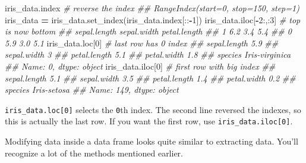 \documentclass[12pt,krantz2]{krantz}
\makeatletter
\newenvironment{Shaded}{\begin{snugshade}}{\end{snugshade}}
\newcommand{\CommentTok}[1]{\textcolor[rgb]{0.37,0.37,0.37}{\textit{#1}}}
\newcommand{\DecValTok}[1]{\textcolor[rgb]{0.06,0.06,0.06}{#1}}
\newcommand{\NormalTok}[1]{#1}
\newcommand{\OperatorTok}[1]{\textcolor[rgb]{0.43,0.43,0.43}{\textbf{#1}}}
\newenvironment{kframe}{%
\medskip{}
\setlength{\fboxsep}{.8em}
 \def\at@end@of@kframe{}%
 \ifinner\ifhmode%
  \def\at@end@of@kframe{\end{minipage}}%
  \begin{minipage}{\columnwidth}%
 \fi\fi%
 \def\FrameCommand##1{\hskip\@totalleftmargin \hskip-\fboxsep
 \colorbox{shadecolor}{##1}\hskip-\fboxsep
     \hskip-\linewidth \hskip-\@totalleftmargin \hskip\columnwidth}%
 \MakeFramed {\advance\hsize-\width
   \@totalleftmargin\z@ \linewidth\hsize
   \@setminipage}}%
 {\par\unskip\endMakeFramed%
 \at@end@of@kframe}
\renewenvironment{Shaded}{\begin{kframe}}{\end{kframe}}
\makeatother
\begin{document}
\begin{Shaded}
\begin{Highlighting}[]
\NormalTok{iris_data.index}
\CommentTok{# reverse the index}
\CommentTok{## RangeIndex(start=0, stop=150, step=1)}
\NormalTok{iris_data }\OperatorTok{=}\NormalTok{ iris_data.set_index(iris_data.index[::}\OperatorTok{-}\DecValTok{1}\NormalTok{]) }
\NormalTok{iris_data.iloc[}\OperatorTok{-}\DecValTok{2}\NormalTok{:,:}\DecValTok{3}\NormalTok{] }\CommentTok{# top is now bottom}
\CommentTok{##    sepal.length  sepal.width  petal.length}
\CommentTok{## 1           6.2          3.4           5.4}
\CommentTok{## 0           5.9          3.0           5.1}
\NormalTok{iris_data.loc[}\DecValTok{0}\NormalTok{] }\CommentTok{# last row has 0 index}
\CommentTok{## sepal.length               5.9}
\CommentTok{## sepal.width                  3}
\CommentTok{## petal.length               5.1}
\CommentTok{## petal.width                1.8}
\CommentTok{## species         Iris-virginica}
\CommentTok{## Name: 0, dtype: object}
\NormalTok{iris_data.iloc[}\DecValTok{0}\NormalTok{] }\CommentTok{# first row with big index }
\CommentTok{## sepal.length            5.1}
\CommentTok{## sepal.width             3.5}
\CommentTok{## petal.length            1.4}
\CommentTok{## petal.width             0.2}
\CommentTok{## species         Iris-setosa}
\CommentTok{## Name: 149, dtype: object}
\end{Highlighting}
\end{Shaded}

\texttt{iris\_data.loc{[}0{]}} selects the \texttt{0}th index. The second line reversed the indexes, so this is actually the last row. If you want the first row, use \texttt{iris\_data.iloc{[}0{]}}.

Modifying data inside a data frame looks quite similar to extracting data. You'll recognize a lot of the methods mentioned earlier.
\end{document}
